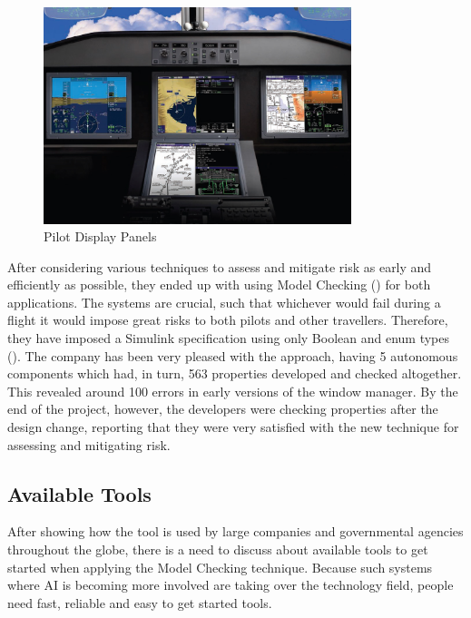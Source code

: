 \documentclass[paper=a4, fontsize=11pt]{scrartcl} %
\numberwithin{equation}{section} %
\numberwithin{figure}{section} %
\numberwithin{table}{section} %
\begin{document}
\begin{figure}[!ht]
    \centering
    \includegraphics[width=0.8\textwidth]{display-panels.jpg}
    \caption{Pilot Display Panels}
\end{figure}

After considering various techniques to assess and mitigate risk as early and efficiently as possible, they ended up with using Model Checking (\cite{rockwell-collins}) for both applications. The systems are crucial, such that whichever would fail during a flight it would impose great risks to both pilots and other travellers. Therefore, they have imposed a Simulink specification using only Boolean and enum types (\cite{acm-model-checking}). The company has been very pleased with the approach, having 5 autonomous components which had, in turn, 563 properties developed and checked altogether. This revealed around 100 errors in early versions of the window manager. By the end of the project, however, the developers were checking properties after the design change, reporting that they were very satisfied with the new technique for assessing and mitigating risk.



\subsection{Available Tools}

\par
After showing how the tool is used by large companies and governmental agencies throughout the globe, there is a need to discuss about available tools to get started when applying the Model Checking technique. Because such systems where AI is becoming more involved are taking over the technology field, people need fast, reliable and easy to get started tools.
\end{document}
